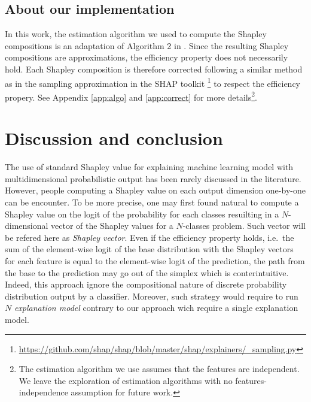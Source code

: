 \documentclass{article}
\theoremstyle{plain}
\theoremstyle{definition}
\theoremstyle{remark}
\begin{document}
\subsection{About our implementation}

In this work, the estimation algorithm we used to compute the Shapley compositions is an adaptation of Algorithm 2 in \cite{vstrumbelj2014explaining}. Since the resulting Shapley compositions are approximations, the efficiency property does not necessarily hold. Each Shapley composition is therefore corrected following a similar method as in the sampling approximation in the SHAP toolkit \cite{NIPS2017_7062}\footnote{\url{https://github.com/shap/shap/blob/master/shap/explainers/_sampling.py}} to respect the efficiency propery. See Appendix \ref{app:algo} and \ref{app:correct} for more details\footnote{The estimation algorithm we use assumes that the features are independent. We leave the exploration of estimation algorithms with no features-independence assumption for future work.}.


\section{Discussion and conclusion}
\label{sec:conclud}

The use of standard Shapley value for explaining machine learning model with multidimensional probabilistic output has been rarely discussed in the literature. However, people computing a Shapley value on each output dimension one-by-one can be encounter. To be more precise, one may first found natural to compute a Shapley value on the logit of the probability for each classes resuilting in a $N$-dimensional vector of the Shapley values for a $N$-classes problem. Such vector will be refered here as \emph{Shapley vector}. Even if the efficiency property holds, i.e.~the sum of the element-wise logit of the base distribution with the Shapley vectors for each feature is equal to the element-wise logit of the prediction, the path from the base to the prediction may go out of the simplex which is conterintuitive. Indeed, this approach ignore the compositional nature of discrete probability distribution output by a classifier. Moreover, such strategy would require to run $N$ \emph{explanation model} contrary to our approach wich require a single explanation model.
\end{document}
